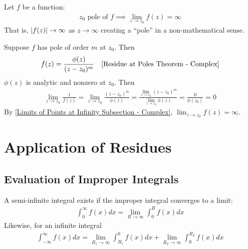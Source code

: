 \documentclass[12pt, english]{book}
\makeatletter
\renewenvironment{proof}[1][\proofname]{\par
	\pushQED{\qed}%
	\normalfont \topsep6\p@\@plus6\p@\relax
	\list{}{%
		\settowidth{\leftmargin}{\itshape\proofname:\hskip\labelsep}%
		\setlength{\labelwidth}{0pt}%
		\setlength{\itemindent}{-\leftmargin}%
	}%
	\item[\hskip\labelsep\itshape#1\@addpunct{:}]\ignorespaces
	}{ \popQED\endlist\@endpefalse}
\makeatother
\begin{document}
	\begin{theorem}
		Let \(f\) be a function:
		\begin{align*}
			z_0 \text{ pole of } f \implies \lim_{z\rightarrow z_0} f(z) = \infty
		\end{align*}
		That is, \(\abs{f(z)} \rightarrow \infty\) as \(z \rightarrow \infty\) creating a ``pole'' in a non-mathematical sense. 
	\end{theorem}
	\begin{proof}
		Suppose \(f\) has pole of order \(m\) at \(z_0\). Then 
		\begin{align*}
			f(z) &= \frac{\phi(z)}{(z-z_0)^m}	&	\text{\Cref{Residue at Poles Theorem - Complex}}
		\end{align*}
		\(\phi(z)\) is analytic and nonzero at \(z_0\). Then
		\begin{align*}
			\lim_{z\rightarrow z_0} \frac{1}{f(z)} 
			= \lim_{z\rightarrow z_0} \frac{(z-z_0)^m}{\phi(z)}
			= \frac{\lim_{z\rightarrow z_0} (z-z_0)^m}{\lim_{z\rightarrow z_0} \phi(z)}
			= \frac{0}{\phi(z_0)} = 0
		\end{align*}
		By \cref{Limits of Points at Infinity Subsection - Complex}, \(\lim_{z\rightarrow z_0} f(z) = \infty\).
	\end{proof}

	\section{Application of Residues} \label{Application of Residues Section - Complex}
	
	\subsection{Evaluation of Improper Integrals} \label{Evaluation of Improper Integrals Subsection - Complex}
	
	\begin{definition}
		\label{Converge (Infinite Integral) Definition - Compleex}
		A semi-infinite integral exists if the improper integral converges to a limit:
		\begin{align*}
			\int_{0}^{\infty} f(x) dx = \lim_{R\rightarrow \infty} \int_{0}^{R} f(x) dx
		\end{align*}
		Likewise, for an infinite integral
		\begin{align*}
			\int_{-\infty}^{\infty} f(x) dx = \lim_{R_1 \rightarrow \infty} \int_{R_1}^{0} f(x) dx + \lim_{R_2 \rightarrow \infty} \int_{0}^{R_2} f(x) dx
		\end{align*}
	\end{definition}
\end{document}
